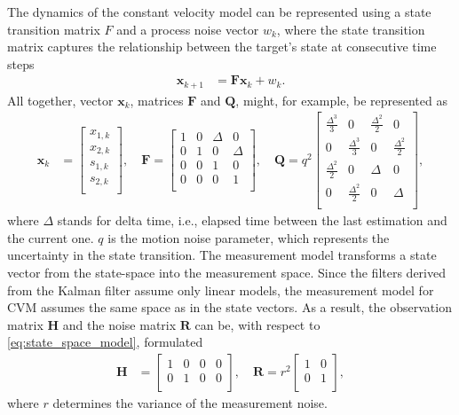 The dynamics of the constant velocity model can be represented using a state transition matrix $F$  and a process
noise vector $w_k$, where the state transition matrix captures the relationship between the target's state at
consecutive time steps
\begin{align}
    \mathbf{x}_{k+1} &= \mathbf{F x}_k +w_k.
\end{align}
All together, vector $\mathbf{x}_k$, matrices $\mathbf{F}$ and $\mathbf{Q}$, might, for example, be represented as
\begin{align}
    \mathbf{x}_k &=
        \begin{bmatrix}
            x_{1,k} \\
            x_{2,k} \\
            s_{1,k} \\
            s_{2,k} \\
        \end{bmatrix},
    \quad \mathbf{F} =
        \begin{bmatrix}
            1 & 0 & \Delta & 0 \\
            0 & 1 & 0 & \Delta \\
            0 & 0 & 1 & 0 \\
            0 & 0 & 0 & 1 \\
        \end{bmatrix},
    \quad \mathbf{Q} = q^2
        \begin{bmatrix}
            \frac{\Delta^3}{3} & 0 & \frac{\Delta^2}{2} & 0 \\
            0 & \frac{\Delta^3}{3} & 0 & \frac{\Delta^2}{2} \\
            \frac{\Delta^2}{2} & 0 & \Delta & 0 \\
            0 & \frac{\Delta^2}{2} & 0 & \Delta \\
        \end{bmatrix},
    \label{eq:state_space_model}
\end{align}
where $\Delta$ stands for delta time, i.e., elapsed time between the last estimation and the current one. $q$ is the
motion noise parameter, which represents the uncertainty in the state transition. The measurement model transforms a
state vector from the state-space into the measurement space. Since the filters derived from the Kalman filter assume only
linear models, the measurement model for CVM assumes the same space as in the state vectors. As a result, the
observation matrix $\mathbf{H}$ and the noise matrix $\mathbf{R}$ can be, with respect to \eqref{eq:state_space_model}, formulated
\begin{align}
    \mathbf{H} &=
    \begin{bmatrix}
        1 & 0 & 0 & 0 \\
        0 & 1 & 0 & 0 \\
    \end{bmatrix},
    \quad \mathbf{R} = r^2
    \begin{bmatrix}
        1 & 0  \\
        0 & 1  \\
    \end{bmatrix},
\end{align}
where $r$ determines the variance of the measurement noise.

